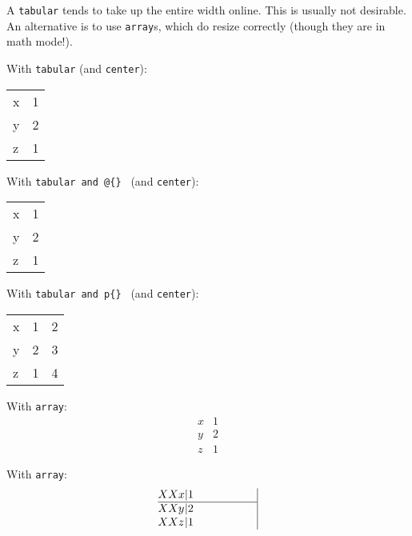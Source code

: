 \documentclass{ximera}
\begin{document}
\begin{example}
    A \verb|tabular| tends to take up the entire width online. This is usually not desirable. An alternative is to use \verb|array|s, which do resize correctly (though they are in math mode!).

    With \verb|tabular| (and \verb|center|):
    \begin{center}
        \begin{tabular}{lr}
            x & 1 \\
            y & 2 \\
            z & 1
        \end{tabular}
    \end{center}

    With \verb|tabular and @{} | (and \verb|center|):
    \begin{center}
        \begin{tabular}{@{}l@{ }r@{.}}
            x & 1 \\
            y & 2 \\
            z & 1
        \end{tabular}
    \end{center}

    With \verb|tabular and p{} | (and \verb|center|):
    \begin{center}
        \begin{tabular}{|p{1cm}|p{2cm}|p{3cm}|}
            x & 1 & 2\\
            y & 2 & 3\\
            z & 1 & 4
        \end{tabular}
    \end{center}

    With \verb|array|:
    $$
    \begin{array}{l|r}
        x & 1 \\
        \hline
        y & 2 \\
        z & 1
    \end{array}
    $$

    With \verb|array|:
    $$
    \begin{array}{@{XX}l@{|}p{2cm}|}
        x & 1 \\
        \hline
        y & 2 \\
        z & 1
    \end{array}
    $$
\end{example}
\end{document}
